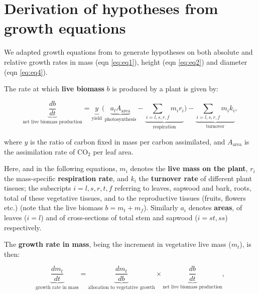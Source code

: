 \documentclass[a4paper]{article}\usepackage[]{graphicx}\usepackage[]{color}
\begin{document}
\clearpage
\begin{appendices}\label{sec:appendices}
\renewcommand{\thefigure}{S\arabic{figure}}
\renewcommand{\thetable}{S\arabic{table}}

\setcounter{figure}{0}
\setcounter{table}{0}

\section{Derivation of hypotheses from growth equations}\label{sec:growth}

We adapted growth equations from \cite{Falster:2011ii} to generate hypotheses on both absolute and relative growth rates in mass (eqn \ref{eq:eq1}), height (eqn \ref{eq:eq2}) and diameter (eqn \ref{eq:eq4}).

The rate at which \textbf{live biomass} $b$ is produced by a plant is given by:

\begin{equation}\label{eq:eq0}
\underbrace{\frac{db}{dt}}_{\text{net live biomass production}} = \underbrace{y}_{\text{yield}}  \big(\underbrace{a_{l} A_{\textrm{area}}}_{\text{photosynthesis}} - \underbrace{\sum_{i = l,s,r,f} m_{i} r_{i}}_{\text{respiration}}\big) - \underbrace{ \sum_{i = l,s,r,f} m_{i} k_{i}}_{\text{turnover}},
\end{equation}

where $y$ is the ratio of carbon fixed in mass per carbon assimilated,  and  $A_{\textrm{area}}$ is the assimilation rate of CO$_{2}$ per leaf area.

Here, and in the following equations, $m_i$ denotes the \textbf{live mass on the plant}, $r_i$ the mass-specific \textbf{respiration rate}, and $k_i$ the \textbf{turnover rate} of different plant tissues; the subscripts $i = l,s,r,t,f$ referring to leaves, sapwood and bark, roots, total of these vegetative tissues, and to the reproductive tissues (fruits, flowers etc.) (note that the live biomass $b = m_t +m_f$). Similarly $a_i$ denotes \textbf{areas}, of leaves ($i = l$) and of cross-sections of total stem and sapwood ($i = st,ss$) respectively.


The \textbf{growth rate in mass}, being the increment in vegetative live mass ($m_t$), is then:

\begin{equation}\label{eq:eq1}
\underbrace{{\frac{dm_t}{dt}}}_{\text{growth rate in mass}} = \underbrace{\frac{dm_t}{db}}_{\text{allocation to vegetative growth}}  \times \underbrace{\frac{db}{dt}}_{\text{net live biomass production}},
\end{equation}


\end{appendices}
\end{document}
